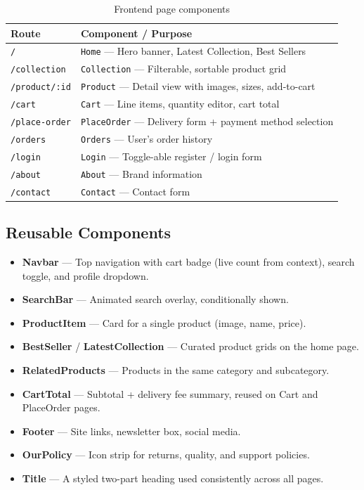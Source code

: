 \documentclass[12pt,a4paper]{report}
\begin{document}
\begin{table}[H]
  \centering
  \caption{Frontend page components}
  \label{tab:pages}
  \begin{tabular}{ll}
    \toprule
    \textbf{Route}           & \textbf{Component / Purpose} \\
    \midrule
    \texttt{/}               & \texttt{Home} — Hero banner, Latest Collection, Best Sellers \\
    \texttt{/collection}     & \texttt{Collection} — Filterable, sortable product grid \\
    \texttt{/product/:id}    & \texttt{Product} — Detail view with images, sizes, add-to-cart \\
    \texttt{/cart}           & \texttt{Cart} — Line items, quantity editor, cart total \\
    \texttt{/place-order}    & \texttt{PlaceOrder} — Delivery form + payment method selection \\
    \texttt{/orders}         & \texttt{Orders} — User's order history \\
    \texttt{/login}          & \texttt{Login} — Toggle-able register / login form \\
    \texttt{/about}          & \texttt{About} — Brand information \\
    \texttt{/contact}        & \texttt{Contact} — Contact form \\
    \bottomrule
  \end{tabular}
\end{table}

\subsection{Reusable Components}

\begin{itemize}[leftmargin=*]
  \item \textbf{Navbar} — Top navigation with cart badge (live count from context), search toggle,
        and profile dropdown.
  \item \textbf{SearchBar} — Animated search overlay, conditionally shown.
  \item \textbf{ProductItem} — Card for a single product (image, name, price).
  \item \textbf{BestSeller} / \textbf{LatestCollection} — Curated product grids on the home page.
  \item \textbf{RelatedProducts} — Products in the same category and subcategory.
  \item \textbf{CartTotal} — Subtotal + delivery fee summary, reused on Cart and PlaceOrder pages.
  \item \textbf{Footer} — Site links, newsletter box, social media.
  \item \textbf{OurPolicy} — Icon strip for returns, quality, and support policies.
  \item \textbf{Title} — A styled two-part heading used consistently across all pages.
\end{itemize}
\end{document}
